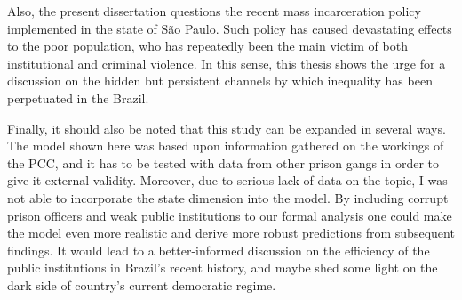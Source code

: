 Also, the present dissertation questions the recent mass incarceration policy implemented in the state of S\~{a}o Paulo. Such policy has caused devastating effects to the poor population, who has repeatedly been the main victim of both institutional and criminal violence. In this sense, this thesis shows the urge for a discussion on the hidden but persistent channels by which inequality has been perpetuated in the Brazil. 

Finally, it should also be noted that this study can be expanded in several ways. The model shown here was based upon information gathered on the workings of the PCC, and it has to be tested with data from other prison gangs in order to give it external validity. Moreover, due to serious lack of data on the topic, I was not able to incorporate the state dimension into the model. By including corrupt prison officers and weak public institutions to our formal analysis one could make the model even more realistic and derive more robust predictions from subsequent findings. It would lead to a better-informed discussion on the efficiency of the public institutions in Brazil's recent history, and maybe shed some light on the dark side of country's current democratic regime.


















